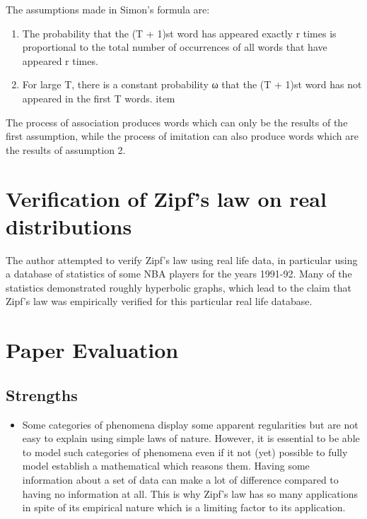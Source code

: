 \documentclass{article}
\begin{document}
The assumptions made in Simon's formula are:
\begin{enumerate}
   \item The probability that the (T + 1)st word has appeared exactly
     r times is proportional to the total number of occurrences of all
     words that have appeared r times.
   \item For large T, there is a constant probability ω that the (T +
     1)st word has not appeared in the first T words. item
\end{enumerate}

The process of association produces words which can only be the
results of the first assumption, while the process of imitation can
also produce words which are the results of assumption 2.

\section{Verification of Zipf's law on real distributions}

The author attempted to verify Zipf's law using real life data, in
particular using a database of statistics of some NBA players for the
years 1991-92. Many of the statistics demonstrated roughly hyperbolic
graphs, which lead to the claim that Zipf's law was empirically
verified for this particular real life database.

\section{Paper Evaluation}
\subsection{Strengths}
\begin{itemize}
\item Some categories of phenomena display some apparent
  regularities but are not easy to explain using simple laws of
  nature. However, it is essential to be able to model such
  categories of phenomena even if it not (yet) possible to fully
  model establish a mathematical which reasons them. Having some
  information about a set of data can make a lot of difference
  compared to having no information at all. This is why Zipf's law
  has so many applications in spite of its empirical nature which is
  a limiting factor to its application. 
\end{itemize}
\end{document}
